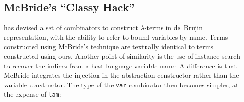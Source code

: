 \documentclass[9pt,preprint,authoryear]{sigplanconf}
\begin{document}
\subsection{McBride{'}s {``}Classy Hack{''}}

%
\citet{mcbride_not_2010} has devised a set of combinators to construct
        $ \lambda $-terms in de{~}Brujin representation, with the ability to refer to
        bound variables by name. Terms constructed using McBride{'}s technique are
        textually identical to terms constructed using ours. Another point of
        similarity is the use of instance search to recover the indices from a
        host-language variable name.
        A difference is that McBride integrates the injection in the abstraction
        constructor rather than the variable constructor. The type of the \textcolor[rgb]{0,0,0.80}{\texttt{var}} combinator then becomes
        simpler, at the expense of \textcolor[rgb]{0,0,0.80}{\texttt{lam}}{:}


%
%


{\nopagebreak }
\end{document}
